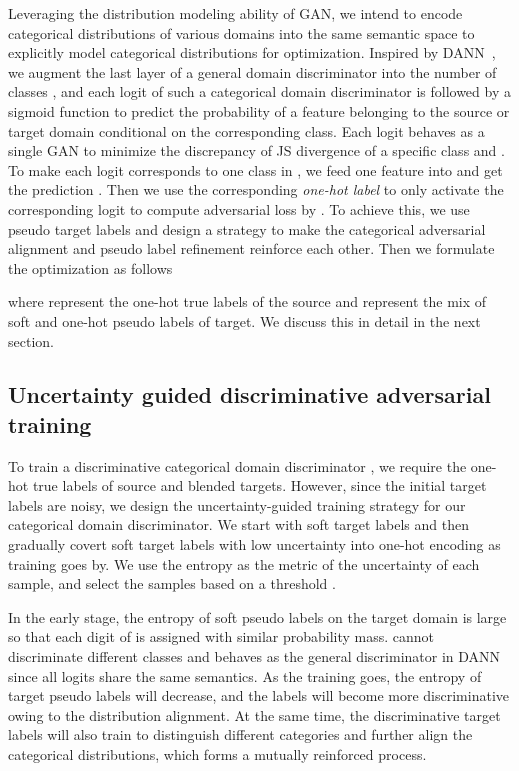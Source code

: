\documentclass[letterpaper]{article} \usepackage{aaai23}  \usepackage{times}  \usepackage{helvet}  \usepackage{courier}  \usepackage[hyphens]{url}  \usepackage{graphicx} \urlstyle{rm} \def\UrlFont{\rm}  \usepackage{natbib}  \usepackage{caption} \frenchspacing  \setlength{\pdfpagewidth}{8.5in}  \setlength{\pdfpageheight}{11in}
\begin{document}
Leveraging the distribution modeling ability of GAN, we intend to encode categorical distributions of various domains into the same semantic space to explicitly model categorical distributions for optimization. Inspired by DANN~\cite{ganin2015unsupervised}, we augment the last layer of a general domain discriminator  into the number of classes , and each logit of such a categorical domain discriminator  is followed by a sigmoid function to predict the probability of a feature belonging to the source or target domain conditional on the corresponding class. Each logit behaves as a single GAN to minimize the discrepancy of JS divergence of a specific class  and . To make each logit corresponds to one class in , we feed one feature  into  and get the prediction . Then we use the corresponding \textit{one-hot label}  to only activate the corresponding logit to compute adversarial loss by . To achieve this, we use pseudo target labels and design a strategy to make the categorical adversarial alignment and pseudo label refinement reinforce each other. Then we formulate the optimization as follows
\begin{small}

\end{small}
where  represent the one-hot true labels of the source and  represent the mix of soft and one-hot pseudo labels of target. We discuss this in detail in the next section.



\subsection{Uncertainty guided discriminative adversarial training}
To train a discriminative categorical domain discriminator , we require the one-hot true labels of source and blended targets. However, since the initial target labels are noisy, we design the uncertainty-guided training strategy for our categorical domain discriminator. We start with soft target labels and then gradually covert soft target labels with low uncertainty into one-hot encoding as training goes by. We use the entropy as the metric of the uncertainty of each sample, and select the samples based on a threshold . 
\begin{small}

\end{small}
\begin{small}

\end{small}
In the early stage, the entropy of soft pseudo labels on the target domain is large so that each digit of  is assigned with similar probability mass.  cannot discriminate different classes and behaves as the general discriminator  in DANN since all logits share the same semantics. As the training goes, the entropy of target pseudo labels will decrease, and the labels will become more discriminative owing to the distribution alignment. At the same time, the discriminative target labels will also train  to distinguish different categories and further align the categorical distributions, which forms a mutually reinforced process.
\end{document}
